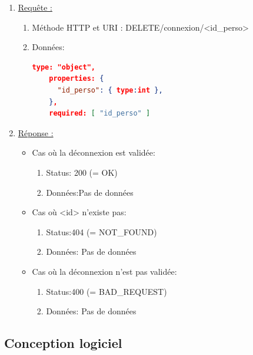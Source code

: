\documentclass[11pt, a4paper]{article}
\begin{document}
  \begin{enumerate}
   \item \underline{Requête :}
    \begin{enumerate}
     \item Méthode HTTP et URI : DELETE/connexion/<id\_perso>
     \item Données:
	\begin{lstlisting}[language=JSON]
	type: "object",
	properties: {
	  "id_perso": { type:int },
	},
	required: [ "id_perso" ]
	\end{lstlisting}
	     
    \end{enumerate}

   \item \underline{Réponse :}
   \begin{itemize}
    \item Cas où la déconnexion est validée:
    \begin{enumerate}
     \item Status: 200 (= OK)
     \item Données:Pas de données\\	 
    \end{enumerate}
    \item Cas où <id> n'existe pas:
    \begin{enumerate}
     \item Status:404 (= NOT\_FOUND)
     \item Données: Pas de données\\
    \end{enumerate}    
    \item Cas où la déconnexion n'est pas validée:
    \begin{enumerate}
     \item Status:400 (= BAD\_REQUEST)
     \item Données: Pas de données\\
    \end{enumerate}
    
   \end{itemize}

  \end{enumerate}
  


  


  \subsection{Conception logiciel}
\end{document}
